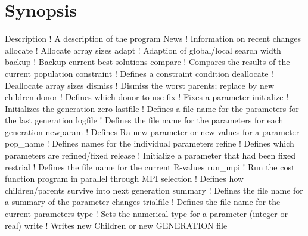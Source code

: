 \section{Synopsis}
\par
\begin{MacVerbatim}
Description ! A description of the program
News        ! Information on recent changes
allocate    ! Allocate array sizes
adapt       ! Adaption of global/local search width
backup      ! Backup current best solutions
compare     ! Compares the results of the current population
constraint  ! Defines a constraint condition
deallocate  ! Deallocate array sizes
dismiss     ! Dismiss the worst parents; replace by new children
donor       ! Defines which donor to use
fix         ! Fixes a parameter
initialize  ! Initializes the generation zero
lastfile    ! Defines a file name for the parameters for the last generation
logfile     ! Defines the file name for the parameters for each generation
newparam    ! Defines Ra new parameter or new values for a parameter
pop_name    ! Defines names for the individual parameters
refine      ! Defines which parameters are refined/fixed
release     ! Initialize a parameter that had been fixed
restrial    ! Defines the file name for the current R-values
run_mpi     ! Run the cost function program in parallel through MPI
selection   ! Defines how children/parents survive into next generation
summary     ! Defines the file name for a summary of the parameter changes
trialfile   ! Defines the file name for the current parameters
type        ! Sets the numerical type for a parameter (integer or real)
write       ! Writes new Children or new GENERATION file
\end{MacVerbatim}
